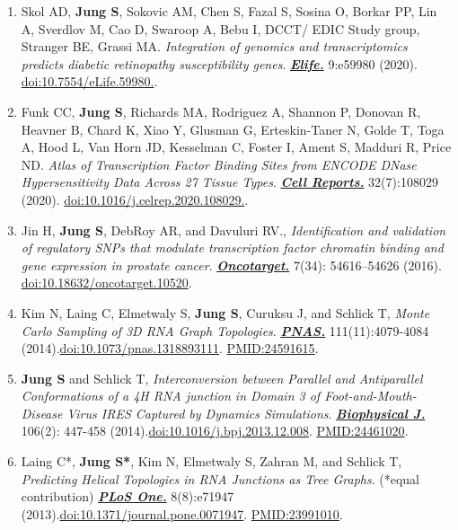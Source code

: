 \documentclass[letterpaper,11pt]{article}
\begin{document}
\begin{enumerate}[1)]

\item
  Skol AD, {\bf Jung S}, Sokovic AM, Chen S, Fazal S, Sosina O, Borkar PP, Lin A, Sverdlov M, Cao D, Swaroop A, Bebu I, DCCT/ EDIC Study group, Stranger BE, Grassi MA.
  {\it Integration of genomics and transcriptomics predicts diabetic retinopathy susceptibility genes}.
  \underline{\it \bf Elife.} { 9:e59980 (2020)}. \href{https://doi.org/10.7554/eLife.59980} {doi:10.7554/eLife.59980.}.

\item
  Funk CC, {\bf Jung S}, Richards MA, Rodriguez A, Shannon P, Donovan R, Heavner B, Chard K, Xiao Y, Glusman G,
  Erteskin-Taner N, Golde T, Toga A, Hood L, Van Horn JD, Kesselman C, Foster I, Ament S, Madduri R, Price ND.
  {\it Atlas of Transcription Factor Binding Sites from ENCODE DNase Hypersensitivity Data Across 27 Tissue Types}.
  \underline{\it \bf Cell Reports.} {32(7):108029 (2020)}. \href{https://doi.org/10.1016/j.celrep.2020.108029} {doi:10.1016/j.celrep.2020.108029.}.

\item
	Jin H, {\bf Jung S}, DebRoy AR, and Davuluri RV., {\it Identification and validation of regulatory SNPs that modulate transcription factor
  chromatin binding and gene expression in prostate cancer}. \underline{\it \bf Oncotarget.} {7(34): 54616–54626 (2016)}. \href{https://doi:10.18632/oncotarget.10520} {doi:10.18632/oncotarget.10520}.

\item
	Kim N, Laing C, Elmetwaly S, {\bf Jung S}, Curuksu J, and Schlick T, {\it Monte Carlo Sampling of 3D RNA Graph Topologies}.	\underline{\it \bf PNAS.} {111(11):4079-4084 (2014)}.\href{http://dx.doi.org/10.1073/pnas.1318893111} {doi:10.1073/pnas.1318893111}. \href{http://www.ncbi.nlm.nih.gov/pubmed/24591615}{PMID:24591615}.

\item
	{\bf Jung S} and Schlick T, {\it Interconversion between Parallel and Antiparallel Conformations of a 4H RNA junction in Domain 3 of Foot-and-Mouth-Disease Virus IRES Captured by Dynamics Simulations}. \underline{\it \bf Biophysical J.} {106(2): 447-458 (2014)}.\href{http://dx.doi.org/10.1016/j.bpj.2013.12.008}{doi:10.1016/j.bpj.2013.12.008}. \href{http://www.ncbi.nlm.nih.gov/pubmed/24461020}{PMID:24461020}.

\item
	Laing C*, {\bf Jung S*}, Kim N, Elmetwaly S, Zahran M, and Schlick T, {\it Predicting Helical Topologies in RNA Junctions as Tree Graphs}. (*equal contribution) \underline{\it \bf PLoS One.} {8(8):e71947 (2013)}.\href{http://dx.doi.org/10.1371/journal.pone.0071947}{doi:10.1371/journal.pone.0071947}. \href{http://www.ncbi.nlm.nih.gov/pubmed/23991010}{PMID:23991010}.


\end{enumerate}
\end{document}
